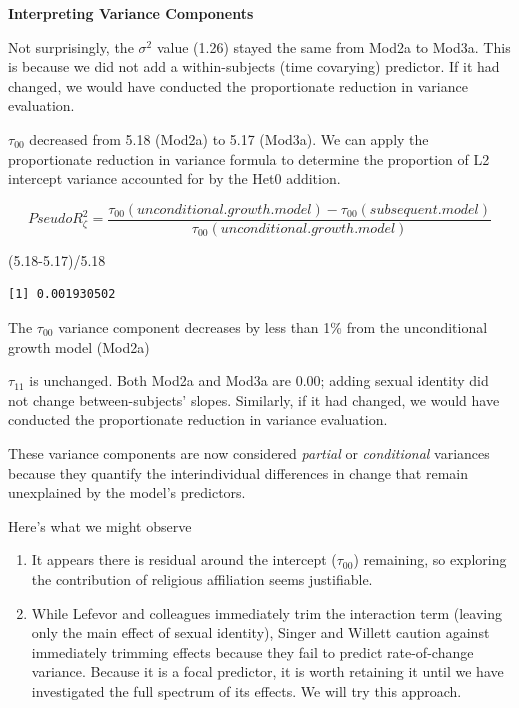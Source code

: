 \documentclass[
  11pt,
]{book}
\newenvironment{Shaded}{\begin{snugshade}}{\end{snugshade}}
\newcommand{\FloatTok}[1]{\textcolor[rgb]{0.00,0.00,0.81}{#1}}
\newcommand{\NormalTok}[1]{#1}
\newcommand{\SpecialCharTok}[1]{\textcolor[rgb]{0.00,0.00,0.00}{#1}}
\providecommand{\tightlist}{%
  \setlength{\itemsep}{0pt}\setlength{\parskip}{0pt}}
\begin{document}
\textbf{Interpreting Variance Components}

Not surprisingly, the \(\sigma ^{2}\) value (1.26) stayed the same from Mod2a to Mod3a. This is because we did not add a within-subjects (time covarying) predictor. If it had changed, we would have conducted the proportionate reduction in variance evaluation.

\(\tau _{00}\) decreased from 5.18 (Mod2a) to 5.17 (Mod3a). We can apply the proportionate reduction in variance formula to determine the proportion of L2 intercept variance accounted for by the Het0 addition.

\[Pseudo R_{\zeta }^{2} = \frac{\tau _{00} (unconditional. growth. model) - \tau _{00}(subsequent. model)}{\tau _{00}(unconditional. growth. model)}\]

\begin{Shaded}
\begin{Highlighting}[]
\NormalTok{(}\FloatTok{5.18{-}5.17}\NormalTok{)}\SpecialCharTok{/}\FloatTok{5.18}
\end{Highlighting}
\end{Shaded}

\begin{verbatim}
[1] 0.001930502
\end{verbatim}

The \(\tau _{00}\) variance component decreases by less than 1\% from the unconditional growth model (Mod2a)

\(\tau _{11}\) is unchanged. Both Mod2a and Mod3a are 0.00; adding sexual identity did not change between-subjects' slopes. Similarly, if it had changed, we would have conducted the proportionate reduction in variance evaluation.

These variance components are now considered \emph{partial} or \emph{conditional} variances because they quantify the interindividual differences in change that remain unexplained by the model's predictors.

Here's what we might observe

\begin{enumerate}
\def\labelenumi{\arabic{enumi}.}
\tightlist
\item
  It appears there is residual around the intercept (\(\tau _{00}\)) remaining, so exploring the contribution of religious affiliation seems justifiable.
\item
  While Lefevor and colleagues \citeyearpar{lefevor_religious_2017} immediately trim the interaction term (leaving only the main effect of sexual identity), Singer and Willett \citeyearpar{singer_applied_2003} caution against immediately trimming effects because they fail to predict rate-of-change variance. Because it is a focal predictor, it is worth retaining it until we have investigated the full spectrum of its effects. We will try this approach.
\end{enumerate}
\end{document}
